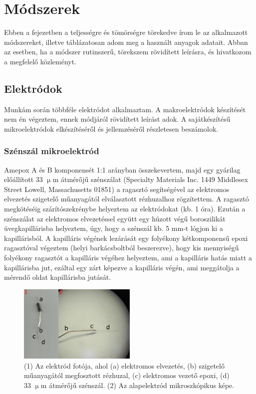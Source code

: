 \chapter{Módszerek}
\pagestyle{headings}

Ebben a fejezetben a teljességre és tömörségre törekedve írom le az alkalmazott módszereket, illetve táblázatosan adom meg a használt anyagok adatait. Abban az esetben, ha a módszer rutinszerű, törekszem rövidített leírásra, és hivatkozom a megfelelő közleményt.

\section{Elektródok}

Munkám során többféle elektródot alkalmaztam. A makroelektródok készítését nem én végeztem, ennek módjáról rövidített leírást adok. A sajátkészítésű mikroelektródok elkészítéséről és jellemzéséről részletesen beszámolok.

\subsection{Szénszál mikroelektród}
Amepox A és B komponensét 1:1 arányban összekevertem, majd egy gyárilag előállított 33 $\upmu$m átmérőjű szénszálat (Specialty Materials Inc. 1449 Middlesex Street Lowell, Massachusetts 01851) a ragasztó segítségével az elektromos elvezetés szigetelő műanyagától elválasztott rézhuzalhoz rögzítettem. A ragasztó megkötéséig szárítószekrénybe helyeztem az elektródokat (kb. 1 óra). Ezután a szénszálat az elektromos elvezetéssel együtt egy húzott végű boroszilikát üvegkapillárisba helyeztem, úgy, hogy a szénszál kb. 5 mm-t lógjon ki a kapillárisból. A kapilláris végének lezárását egy folyékony kétkomponensű epoxi ragasztóval végeztem (helyi barkácsboltból beszerezve), hogy kis mennyiségű folyékony ragasztót a kapilláris végéhez helyeztem, ami a kapilláris hatás miatt a kapillárisba jut, ezáltal egy zárt képezve a kapilláris végén, ami meggátolja a mérendő oldat kapillárisba jutását.
\begin{figure}[h]
\centering
\includegraphics[width=0.5\textwidth]{img/szen33.png}
\caption{(1) Az elektród fotója, ahol (a) elektromos elvezetés, (b) szigetelő műanyagától megfosztott rézhuzal, (c) elektromos vezető epoxi, (d) 33 $\upmu$m átmérőjű szénszál. (2) Az alapelektród mikroszkópikus képe.}
\label{fig:ionophores}
\end{figure}

